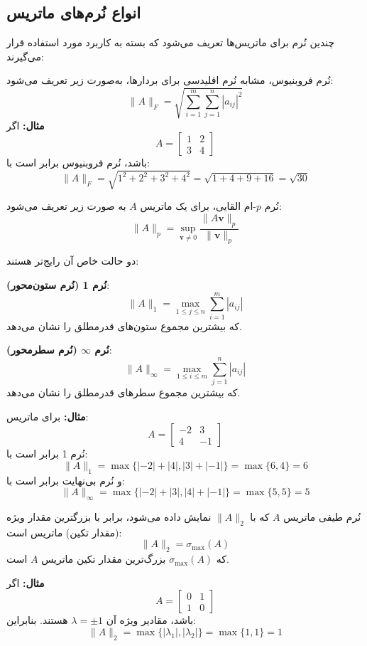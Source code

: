 \subsection{انواع نُرم‌های ماتریس}
چندین نُرم برای ماتریس‌ها تعریف می‌شود که بسته به کاربرد مورد استفاده قرار می‌گیرند:
\begin{definition}
نُرم فروبنیوس، مشابه نُرم اقلیدسی برای بردارها، به‌صورت زیر تعریف می‌شود:
\[
\|A\|_F = \sqrt{\sum_{i=1}^{m} \sum_{j=1}^{n} |a_{ij}|^2}
\]
\textbf{مثال:}  
اگر
\[
A = \begin{bmatrix} 1 & 2 \\ 3 & 4 \end{bmatrix}
\]
باشد، نُرم فروبنیوس برابر است با:
\[
\|A\|_F = \sqrt{1^2 + 2^2 + 3^2 + 4^2} = \sqrt{1 + 4 + 9 + 16} = \sqrt{30}
\]
\end{definition}
\begin{definition}
نُرم $p$-ام القایی، برای یک ماتریس $A$ به صورت زیر تعریف می‌شود:
\[
\|A\|_p = \sup_{\mathbf{v} \neq 0} \frac{\|A\mathbf{v}\|_p}{\|\mathbf{v}\|_p}
\]

دو حالت خاص آن رایج‌تر هستند:

\textbf{نُرم 1 (نُرم ستون‌محور)}:
\[
\|A\|_1 = \max_{1 \leq j \leq n} \sum_{i=1}^{m} |a_{ij}|
\]
که بیشترین مجموع ستون‌های قدرمطلق را نشان می‌دهد.

\textbf{نُرم $\infty$ (نُرم سطرمحور)}:
\[
\|A\|_{\infty} = \max_{1 \leq i \leq m} \sum_{j=1}^{n} |a_{ij}|
\]
که بیشترین مجموع سطرهای قدرمطلق را نشان می‌دهد.

\textbf{مثال:}  
برای ماتریس:
\[
A = \begin{bmatrix} -2 & 3 \\ 4 & -1 \end{bmatrix}
\]
نُرم 1 برابر است با:
\[
\|A\|_1 = \max\{|-2| + |4|, |3| + |-1|\} = \max\{6, 4\} = 6
\]
و نُرم بی‌نهایت برابر است با:
\[
\|A\|_{\infty} = \max\{|-2| + |3|, |4| + |-1|\} = \max\{5, 5\} = 5
\]
\end{definition}
\begin{definition}
نُرم طیفی ماتریس $A$ که با $\|A\|_2$ نمایش داده می‌شود، برابر با بزرگترین مقدار ویژه (مقدار تکین) ماتریس است:
\[
\|A\|_2 = \sigma_{\max}(A)
\]
که $\sigma_{\max}(A)$ بزرگ‌ترین مقدار تکین ماتریس $A$ است.

\textbf{مثال:}  
اگر 
\[
A = \begin{bmatrix} 0 & 1 \\ 1 & 0 \end{bmatrix}
\]
باشد، مقادیر ویژه آن $\lambda = \pm 1$ هستند. بنابراین:
\[
\|A\|_2 = \max\{|\lambda_1|, |\lambda_2|\} = \max\{1, 1\} = 1
\]
\end{definition}
